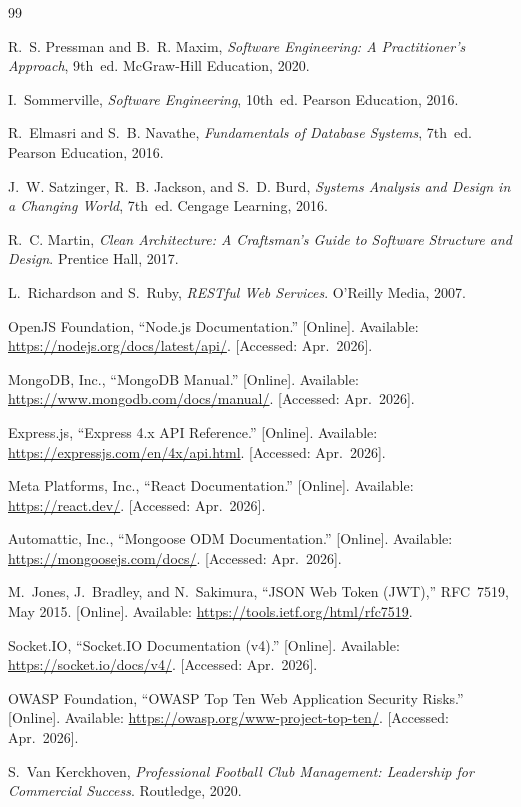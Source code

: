 \documentclass[12pt,a4paper,oneside]{report}
\begin{document}
\begin{thebibliography}{99}

R.~S. Pressman and B.~R. Maxim, \textit{Software Engineering: A Practitioner's Approach}, 9th~ed. McGraw-Hill Education, 2020.

I.~Sommerville, \textit{Software Engineering}, 10th~ed. Pearson Education, 2016.

R.~Elmasri and S.~B. Navathe, \textit{Fundamentals of Database Systems}, 7th~ed. Pearson Education, 2016.

J.~W. Satzinger, R.~B. Jackson, and S.~D. Burd, \textit{Systems Analysis and Design in a Changing World}, 7th~ed. Cengage Learning, 2016.

R.~C. Martin, \textit{Clean Architecture: A Craftsman's Guide to Software Structure and Design}. Prentice Hall, 2017.

L.~Richardson and S.~Ruby, \textit{RESTful Web Services}. O'Reilly Media, 2007.

OpenJS Foundation, ``Node.js Documentation.'' [Online]. Available: \url{https://nodejs.org/docs/latest/api/}. [Accessed: Apr.~2026].

MongoDB, Inc., ``MongoDB Manual.'' [Online]. Available: \url{https://www.mongodb.com/docs/manual/}. [Accessed: Apr.~2026].

Express.js, ``Express 4.x API Reference.'' [Online]. Available: \url{https://expressjs.com/en/4x/api.html}. [Accessed: Apr.~2026].

Meta Platforms, Inc., ``React Documentation.'' [Online]. Available: \url{https://react.dev/}. [Accessed: Apr.~2026].

Automattic, Inc., ``Mongoose ODM Documentation.'' [Online]. Available: \url{https://mongoosejs.com/docs/}. [Accessed: Apr.~2026].

M.~Jones, J.~Bradley, and N.~Sakimura, ``JSON Web Token (JWT),'' RFC~7519, May 2015. [Online]. Available: \url{https://tools.ietf.org/html/rfc7519}.

Socket.IO, ``Socket.IO Documentation (v4).'' [Online]. Available: \url{https://socket.io/docs/v4/}. [Accessed: Apr.~2026].

OWASP Foundation, ``OWASP Top Ten Web Application Security Risks.'' [Online]. Available: \url{https://owasp.org/www-project-top-ten/}. [Accessed: Apr.~2026].

S.~Van Kerckhoven, \textit{Professional Football Club Management: Leadership for Commercial Success}. Routledge, 2020.

\end{thebibliography}
\end{document}
